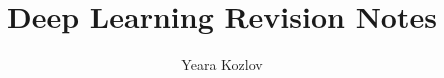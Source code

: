 \documentclass[10pt,landscape,twocolumn]{article}
\begin{document}

\title{Deep Learning Revision Notes}
\author{Yeara Kozlov}
\date{}

\maketitle


\tableofcontents
\clearemptydoublepage





\setcounter{page}{1}

% 
% 
% 
% 
% 






%


% 

\end{document}
